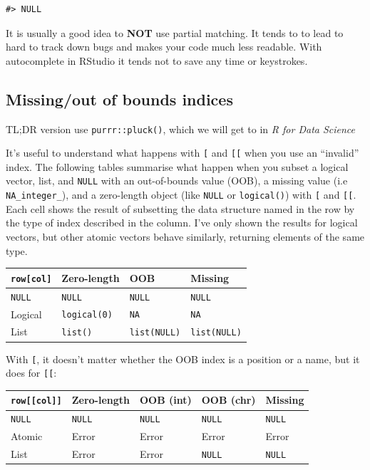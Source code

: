 \documentclass[]{book}
\theoremstyle{definition}
\theoremstyle{definition}
\theoremstyle{definition}
\theoremstyle{remark}
\begin{document}
\begin{verbatim}
#> NULL
\end{verbatim}

It is usually a good idea to \textbf{NOT} use partial matching. It tends
to to lead to hard to track down bugs and makes your code much less
readable. With autocomplete in RStudio it tends not to save any time or
keystrokes.

\subsection{Missing/out of bounds
indices}\label{missingout-of-bounds-indices}

TL;DR version use \texttt{purrr::pluck()}, which we will get to in
\emph{R for Data Science}

It's useful to understand what happens with \texttt{{[}} and
\texttt{{[}{[}} when you use an ``invalid'' index. The following tables
summarise what happen when you subset a logical vector, list, and
\texttt{NULL} with an out-of-bounds value (OOB), a missing value (i.e
\texttt{NA\_integer\_}), and a zero-length object (like \texttt{NULL} or
\texttt{logical()}) with \texttt{{[}} and \texttt{{[}{[}}. Each cell
shows the result of subsetting the data structure named in the row by
the type of index described in the column. I've only shown the results
for logical vectors, but other atomic vectors behave similarly,
returning elements of the same type.

\begin{longtable}[]{@{}llll@{}}
\toprule
\texttt{row{[}col{]}} & Zero-length & OOB & Missing\tabularnewline
\midrule
\endhead
\texttt{NULL} & \texttt{NULL} & \texttt{NULL} &
\texttt{NULL}\tabularnewline
Logical & \texttt{logical(0)} & \texttt{NA} & \texttt{NA}\tabularnewline
List & \texttt{list()} & \texttt{list(NULL)} &
\texttt{list(NULL)}\tabularnewline
\bottomrule
\end{longtable}

With \texttt{{[}}, it doesn't matter whether the OOB index is a position
or a name, but it does for \texttt{{[}{[}}:

\begin{longtable}[]{@{}lllll@{}}
\toprule
\texttt{row{[}{[}col{]}{]}} & Zero-length & OOB (int) & OOB (chr) &
Missing\tabularnewline
\midrule
\endhead
\texttt{NULL} & \texttt{NULL} & \texttt{NULL} & \texttt{NULL} &
\texttt{NULL}\tabularnewline
Atomic & Error & Error & Error & Error\tabularnewline
List & Error & Error & \texttt{NULL} & \texttt{NULL}\tabularnewline
\bottomrule
\end{longtable}
\end{document}
